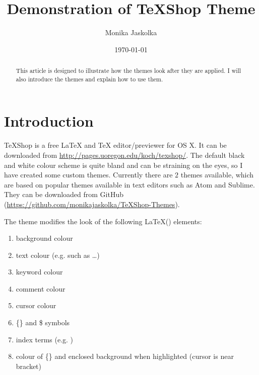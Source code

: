 \documentclass{article}
\begin{document}
\title{Demonstration of TeXShop Theme}
\author{Monika Jaskolka}
\date{\today}
\maketitle

\begin{abstract}
This article is designed to illustrate how the themes look after they are applied. I will also introduce the themes and explain how to use them.
\end{abstract}

\section{Introduction}
TeXShop is a free \LaTeX{} and \TeX{} editor/previewer for OS X. It can be downloaded from \url{http://pages.uoregon.edu/koch/texshop/}. The default black and white colour scheme is quite bland and can be straining on the eyes, so I have created some custom themes. Currently there are $2$ themes available, which are based on popular themes available in text editors such as Atom and Sublime. They can be downloaded from GitHub (\url{https://github.com/monikajaskolka/TeXShop-Themes}).

The theme modifies the look of the following \LaTeX() elements:

\begin{enumerate}
		\item background colour
		\item text colour (e.g. such as \ldots)
		\item keyword colour 
		\item comment colour %
		\item cursor colour 
		\item \{\} and \$ symbols {} $ $
		\item index terms (e.g. )
		\item colour of \{\} and enclosed background when highlighted (cursor is near bracket)
\end{enumerate}

\end{document}
